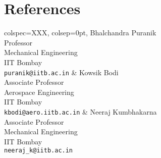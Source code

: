 \documentclass[a4paper,10pt]{article}
\begin{document}
\section{References}
\begin{tblr}{%
    colspec={XXX},
    colsep=0pt,
}
    {
        Bhalchandra Puranik\\
        Professor\\
        Mechanical Engineering\\
        IIT Bombay\\
        \texttt{puranik@iitb.ac.in}
    } &
    {
        Kowsik Bodi\\
        Associate Professor\\
        Aerospace Engineering\\
        IIT Bombay\\
        \texttt{kbodi@aero.iitb.ac.in}
    } &
    {
        Neeraj Kumbhakarna\\
        Associate Professor\\
        Mechanical Engineering\\
        IIT Bombay\\
        \texttt{neeraj\_k@iitb.ac.in}
    }
\end{tblr}
\end{document}
